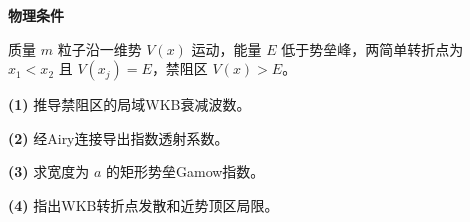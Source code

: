 \textbf{物理条件}\par 质量 \(m\) 粒子沿一维势 \(V(x)\) 运动，能量 \(E\) 低于势垒峰，两简单转折点为 \(x_1<x_2\) 且 \(V(x_j)=E\)，禁阻区 \(V(x)>E\)。
\par\noindent\textbf{(1)} 推导禁阻区的局域WKB衰减波数。
\par\noindent\textbf{(2)} 经Airy连接导出指数透射系数。
\par\noindent\textbf{(3)} 求宽度为 \(a\) 的矩形势垒Gamow指数。
\par\noindent\textbf{(4)} 指出WKB转折点发散和近势顶区局限。
